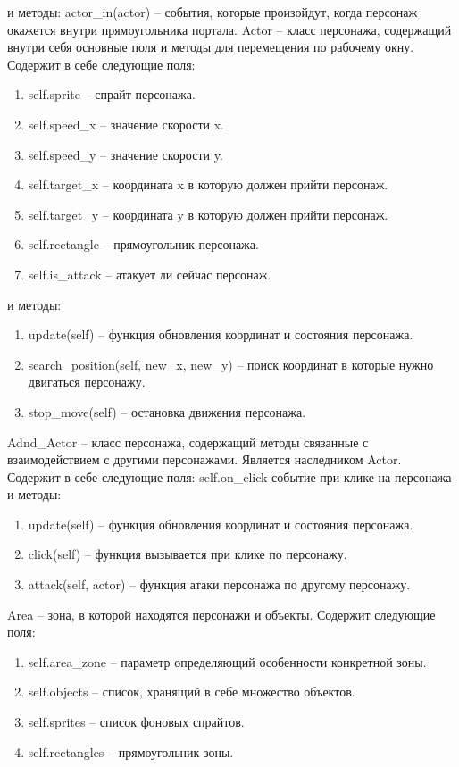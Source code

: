 		и методы:
			actor\_in(actor) -- события, которые произойдут, когда персонаж окажется внутри прямоугольника портала.
	Actor -- класс персонажа, содержащий внутри себя основные поля и методы для перемещения по рабочему окну. Содержит в себе следующие поля:
		\begin{enumerate}
			\item self.sprite -- спрайт персонажа.
			\item self.speed\_x -- значение скорости x.
			\item self.speed\_y -- значение скорости y.
			\item self.target\_x -- координата x в которую должен прийти персонаж.
			\item self.target\_y -- координата y в которую должен прийти персонаж.
			\item self.rectangle -- прямоугольник персонажа.
			\item self.is\_attack -- атакует ли сейчас персонаж.
		\end{enumerate}
		и методы:
		\begin{enumerate}
			\item update(self) -- функция обновления координат и состояния персонажа.
			\item search\_position(self, new\_x, new\_y) -- поиск координат в которые нужно двигаться персонажу.
			\item stop\_move(self) -- остановка движения персонажа.
		\end{enumerate}
	Adnd\_Actor -- класс персонажа, содержащий методы связанные с взаимодействием с другими персонажами. Является наследником Actor. Содержит в себе следующие поля:
		self.on\_click событие при клике на персонажа
		и методы:
		\begin{enumerate}
			\item update(self) -- функция обновления координат и состояния персонажа.
			\item click(self) -- функция вызывается при клике по персонажу.
			\item attack(self, actor) --  функция атаки персонажа по другому персонажу.
		\end{enumerate}
	Area -- зона, в которой находятся персонажи и объекты. Содержит следующие поля:
		\begin{enumerate}
			\item self.area\_zone -- параметр определяющий особенности конкретной зоны.
			\item self.objects -- список, хранящий в себе множество объектов.
			\item self.sprites -- список фоновых спрайтов.
			\item self.rectangles -- прямоугольник зоны.
		\end{enumerate}
